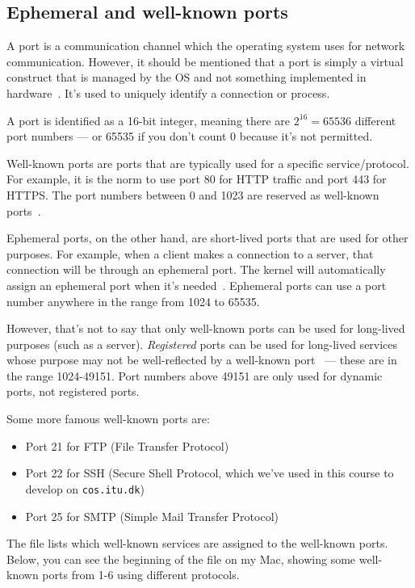 \subsection{Ephemeral and well-known ports}

A port is a communication channel which the operating system uses for network communication. However, it should be mentioned that a port is simply a virtual construct that is managed by the OS and not something implemented in hardware~\cite{cloudflare-port}. It's used to uniquely identify a connection or process.

A port is identified as a 16-bit integer, meaning there are $2^{16} = 65536$ different port numbers --- or 65535 if you don't count 0 because it's not permitted.

Well-known ports are ports that are typically used for a specific service/protocol. For example, it is the norm to use port 80 for HTTP traffic and port 443 for HTTPS. The port numbers between 0 and 1023 are reserved as well-known ports~\cite{registered-port}.

Ephemeral ports, on the other hand, are short-lived ports that are used for other purposes. For example, when a client makes a connection to a server, that connection will be through an ephemeral port. The kernel will automatically assign an ephemeral port when it's needed~\cite[p. 966]{computersystems}. Ephemeral ports can use a port number anywhere in the range from 1024 to 65535.

However, that's not to say that only well-known ports can be used for long-lived purposes (such as a server). \textit{Registered} ports can be used for long-lived services whose purpose may not be well-reflected by a well-known port~\cite{registered-port} --- these are in the range 1024-49151. Port numbers above 49151 are only used for dynamic ports, not registered ports.

Some more famous well-known ports are:

\begin{itemize}
  \item Port 21 for FTP (File Transfer Protocol)
  \item Port 22 for SSH (Secure Shell Protocol, which we've used in this course to develop on \texttt{cos.itu.dk})
  \item Port 25 for SMTP (Simple Mail Transfer Protocol)
\end{itemize}

The  file lists which well-known services are assigned to the well-known ports.
Below, you can see the beginning of the  file on my Mac, showing some well-known ports from 1-6 using different protocols.

